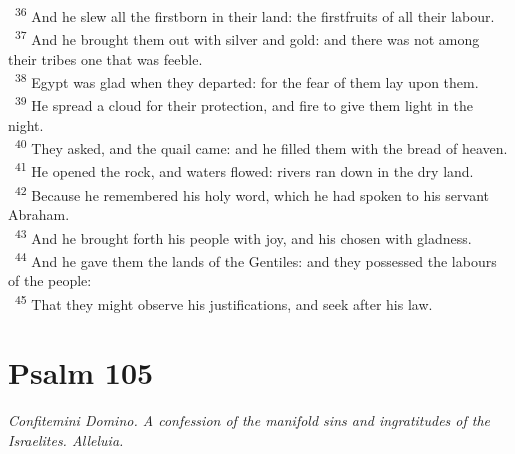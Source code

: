\documentclass[a5paper,12pt]{article}
\begin{document}
\begin{multicols*}{2}
~\textsuperscript{36} And he slew all the firstborn in their land: the firstfruits of all their labour.\\
~\textsuperscript{37} And he brought them out with silver and gold: and there was not among their tribes one that was feeble.\\
~\textsuperscript{38} Egypt was glad when they departed: for the fear of them lay upon them.\\
~\textsuperscript{39} He spread a cloud for their protection, and fire to give them light in the night.\\
~\textsuperscript{40} They asked, and the quail came: and he filled them with the bread of heaven.\\
~\textsuperscript{41} He opened the rock, and waters flowed: rivers ran down in the dry land.\\
~\textsuperscript{42} Because he remembered his holy word, which he had spoken to his servant Abraham.\\
~\textsuperscript{43} And he brought forth his people with joy, and his chosen with gladness.\\
~\textsuperscript{44} And he gave them the lands of the Gentiles: and they possessed the labours of the people:\\
~\textsuperscript{45} That they might observe his justifications, and seek after his law.\\

\section{Psalm 105}
\label{sec:orgeca7834}
\emph{Confitemini Domino. A confession of the manifold sins and ingratitudes of the Israelites. Alleluia.}\\


\end{multicols*}
\end{document}
